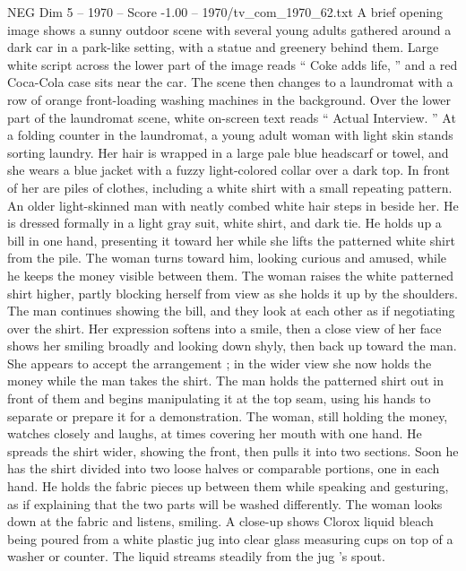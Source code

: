 \begin{textsample}{NEG Dim 5 – 1970 – Score -1.00 – 1970/tv\_com\_1970\_62.txt}  \label{ex:f5_neg_016}
A brief opening image shows a sunny outdoor scene with several young adults gathered around a dark car in a park-like setting, with a statue and greenery behind them.
Large white script across the lower part of the image reads “ Coke adds life, ” and a red Coca-Cola case sits near the car.
The scene then changes to a laundromat with a row of orange front-loading washing machines in the background.
Over the lower part of the laundromat scene, white on-screen text reads “ Actual Interview. ” At a folding counter in the laundromat, a young adult woman with light skin stands sorting laundry.
Her hair is wrapped in a large pale blue headscarf or towel, and she wears a blue jacket with a fuzzy light-colored collar over a dark top.
In front of her are piles of clothes, including a white shirt with a small repeating pattern.
An older light-skinned man with neatly combed white hair steps in beside her.
He is dressed formally in a light gray suit, white shirt, and dark tie.
He holds up a bill in one hand, presenting it toward her while she lifts the patterned white shirt from the pile.
The woman turns toward him, looking curious and amused, while he keeps the money visible between them.
The woman raises the white patterned shirt higher, partly blocking herself from view as she holds it up by the shoulders.
The man continues showing the bill, and they look at each other as if negotiating over the shirt.
Her expression softens into a smile, then a close view of her face shows her smiling broadly and looking down shyly, then back up toward the man.
She appears to accept the arrangement ; in the wider view she now holds the money while the man takes the shirt.
The man holds the patterned shirt out in front of them and begins manipulating it at the top seam, using his hands to separate or prepare it for a demonstration.
The woman, still holding the money, watches closely and laughs, at times covering her mouth with one hand.
He spreads the shirt wider, showing the front, then pulls it into two sections.
Soon he has the shirt divided into two loose halves or comparable portions, one in each hand.
He holds the fabric pieces up between them while speaking and gesturing, as if explaining that the two parts will be washed differently.
The woman looks down at the fabric and listens, smiling.
A close-up shows Clorox liquid bleach being poured from a white plastic jug into clear glass measuring cups on top of a washer or counter.
The liquid streams steadily from the jug ’s spout.

\end{textsample}
